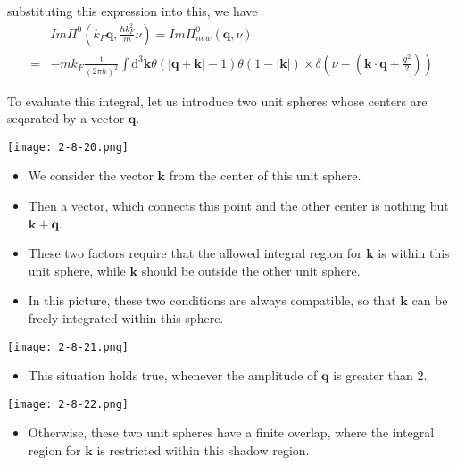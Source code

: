 substituting this expression into this, we have
\[\begin{split}& Im\Pi^0(k_F \mathbf{q}, \frac{\hbar k_F^2}{m}\nu) = Im\Pi^0_{new}(\mathbf{q},\nu)\\
=& -m k_F \frac{1}{(2\pi \hbar)^2} \int \mathrm{d}^3 \mathbf{k} \theta(|\mathbf{q}+\mathbf{k}|-1) \theta(1-|\mathbf{k}|) \times \delta(\nu-(\mathbf{k}\cdot \mathbf{q}+\frac{q^2}{2})) \end{split}\]

To evaluate this integral, let us introduce two unit spheres whose centers are seqarated by a vector $\mathbf{q}$.

\begin{center} \label{Fig2.8.20}
\texttt{[image: 2-8-20.png]}
\end{center}
\begin{itemize}
\item We consider the vector $\mathbf{k}$ from the center of this unit sphere.

\item Then a vector, which connects this point and the other center is nothing but $\mathbf{k}+\mathbf{q}$.

\item These two factors require that the allowed integral region for $\mathbf{k}$ is within this unit sphere, while $\mathbf{k}$ should be outside the other unit sphere.

\item In this picture, these two conditions are always compatible, so that $\mathbf{k}$ can be freely integrated within this sphere.
\end{itemize}

\begin{center} \label{Fig2.8.21}
\texttt{[image: 2-8-21.png]}
\end{center}
\begin{itemize}
\item This situation holds true, whenever the amplitude of $\mathbf{q}$ is greater than 2.
\end{itemize}

\begin{center} \label{Fig2.8.22}
\texttt{[image: 2-8-22.png]}
\end{center}
\begin{itemize}
\item Otherwise, these two unit spheres have a finite overlap, where the integral region for $\mathbf{k}$ is restricted within this shadow region.
\end{itemize}

